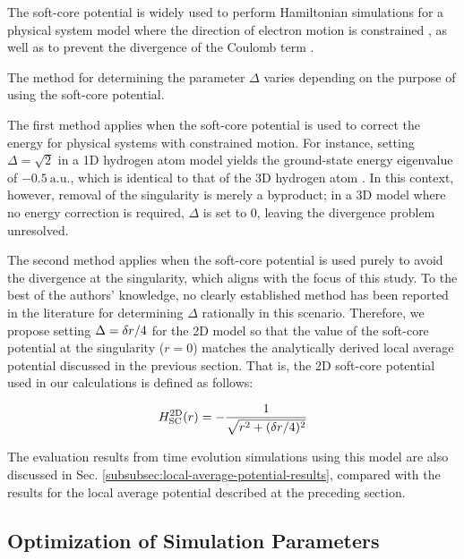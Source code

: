 \documentclass[aip-draft.tex]{subfiles}
\begin{document}
The soft-core potential is widely used to perform Hamiltonian simulations for a
physical system model where the direction of electron motion is constrained
\cite{Hall2009.PhysRevA.80.032507, Fernandez_1991,
LiChen2021.doi:10.1021/acs.jpca.1c00698}, as well as to prevent the divergence
of the Coulomb term \cite{Childs2022quantumsimulationof}.

The method for determining the parameter $\Delta$ varies depending on the
purpose of using the soft-core potential.

The first method applies when the soft-core potential is used to correct the
energy for physical systems with constrained motion. For instance, setting
$\Delta=\sqrt{2}$ in a 1D hydrogen atom model yields the ground-state energy
eigenvalue of $-0.5\ \mathrm{a.u.}$, which is identical to that of the 3D
hydrogen atom \cite{Eberly1991.PhysRevA.44.5997}. In this context, however,
removal of the singularity is merely a byproduct; in a 3D model where no energy
correction is required, $\Delta$ is set to $0$, leaving the divergence problem
unresolved.

The second method applies when the soft-core potential is used purely to avoid
the divergence at the singularity, which aligns with the focus of this study. To
the best of the authors' knowledge, no clearly established method has been
reported in the literature for determining $\Delta$ rationally in this scenario.
Therefore, we propose setting $\Delta = \delta r/4$ for the 2D model so that the
value of the soft-core potential at the singularity ($r=0$) matches the
analytically derived local average potential discussed in the previous section.
That is, the 2D soft-core potential used in our calculations is defined as
follows:

\begin{equation}
H_{\mathrm{SC}}^{\mathrm{2D}}(r) = - \frac{1}{\sqrt{r^2+(\delta r/4)^2}}
\label{eq:Hsc2r-fixed}
\end{equation}

The evaluation results from time evolution simulations using this model are also
discussed in Sec. \ref{subsubsec:local-average-potential-results}, compared with
the results for the local average potential described at the preceding section.

\subsection{Optimization of Simulation Parameters}
\label{subsec:optimization-of-simulation-parameters}
\end{document}

